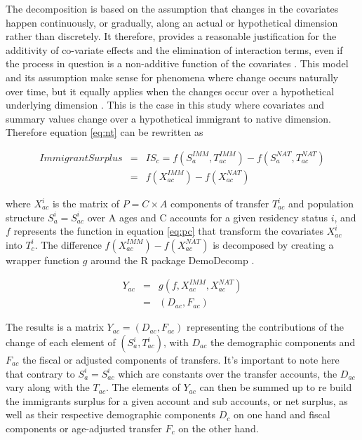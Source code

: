 The decomposition is based on the assumption that changes in the covariates happen continuously, or gradually, along an actual or hypothetical dimension rather than discretely.
It therefore, provides a reasonable justification for the additivity of co-variate effects and the elimination of interaction terms, even if the process in question is a non-additive function of the covariates \citep[p.~786]{Horiuchi:2008cn}.
This model and its assumption make sense for phenomena where change occurs naturally over time, but it equally applies when the changes occur over a hypothetical underlying dimension \citep[p.~790]{Horiuchi:2008cn}.
This is the case in this study where covariates and summary values change over a hypothetical immigrant to native dimension.
Therefore equation \eqref{eq:nt} can be rewritten as

\begin{eqnarray}
  Immigrant Surplus &=&IS_{c}=f(S^{IMM}_a, T^{IMM}_{ac})-f(S^{NAT}_a, T^{NAT}_{ac}) \nonumber \\
&=& f(X^{IMM}_{ac})-f(X^{NAT}_{ac}) \label{eq:dc}
\end{eqnarray}

\vspace{0.7em}\par
where \( X^{i}_{ac}\) is the matrix of \( P=C \times A  \) components of transfer \( T^{i}_{ac} \) and population structure \( S^{i}_{a}=S^{i}_{ac} \) over A ages and C accounts for a given residency status \( i \), and \( f \) represents the function in equation \eqref{eq:pc} that transform the covariates \( X^{i}_{ac}\) into \(T^{i}_c\).
The difference \( f(X^{IMM}_{ac}) - f(X^{NAT}_{ac}) \) is decomposed by creating a wrapper function \(g\) around the R package DemoDecomp \citep{DemoDecomp:2018,Rstat:2018}.

\begin{eqnarray}
  Y_{ac}&=&g(f,X^{IMM}_{ac},X^{NAT}_{ac}) \nonumber \\
&=& (D_{ac}, F_{ac}) \label{eq:dc2}
\end{eqnarray}

The results is a matrix \( Y_{ac} = (D_{ac}, F_{ac}) \) representing the contributions of the change of each element of \( (S^{i}_a, T^{i}_{ac})\), with \( D_{ac}\) the demographic components and \( F_{ac}\) the fiscal or adjusted components of transfers.
It's important to note here that contrary to  \( S^{i}_{a}=S^{i}_{ac} \) which are constants over the transfer accounts, the \( D_{ac} \) vary along with the \(T_{ac}\).
The elements of \( Y_{ac} \) can then be summed up to re build the immigrants surplus for a given account and sub accounts, or net surplus, as well as their respective demographic components \( D_{c} \) on one hand and fiscal components or age-adjusted transfer \( F_{c} \) on the other hand.

